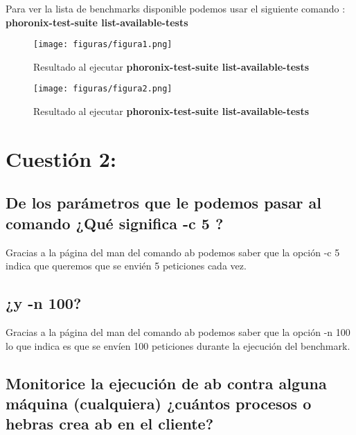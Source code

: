 Para ver la lista de benchmarks disponible podemos usar el siguiente comando \cite{phoronix-suite}:\\
\textbf{phoronix-test-suite list-available-tests}

\begin{figure}[H] %
	\centering
	\texttt{[image: figuras/figura1.png]}  %
	\label{figura1}
	
	\caption{Resultado al ejecutar \textbf{phoronix-test-suite list-available-tests}}
\end{figure}

\begin{figure}[H] %
	\centering
	\texttt{[image: figuras/figura2.png]}  %
	\label{figura2}
	
	\caption{Resultado al ejecutar \textbf{phoronix-test-suite list-available-tests}}
\end{figure}


\section{Cuestión 2:}

\subsection{De los parámetros que le podemos pasar al comando ¿Qué significa -c 5 ?}
Gracias  a la página del man del comando ab \cite{ab} podemos saber que la opción -c 5 indica que queremos que se envién 5 peticiones cada vez.
\subsection{¿y -n 100?}
Gracias  a la página del man del comando ab \cite{ab} podemos saber que la opción -n 100 lo que indica es que se envíen 100 peticiones durante la ejecución del benchmark.
\subsection{Monitorice la ejecución de ab contra alguna máquina (cualquiera) ¿cuántos procesos o hebras crea ab en el cliente?}

